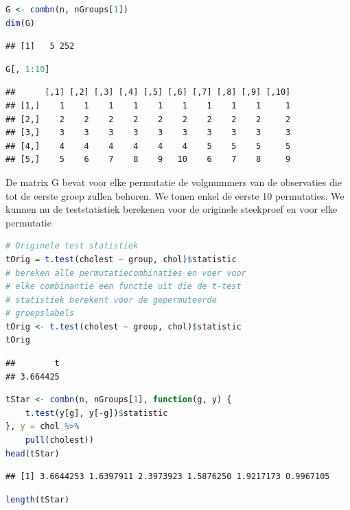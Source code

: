 \documentclass[
  12pt,dutch,coursenotes]{book}
\theoremstyle{definition}
\theoremstyle{definition}
\theoremstyle{definition}
\theoremstyle{definition}
\theoremstyle{remark}
\begin{document}
\begin{lstlisting}[language=R]
G <- combn(n, nGroups[1])
dim(G)
\end{lstlisting}

\begin{lstlisting}
## [1]   5 252
\end{lstlisting}

\begin{lstlisting}[language=R]
G[, 1:10]
\end{lstlisting}

\begin{lstlisting}
##      [,1] [,2] [,3] [,4] [,5] [,6] [,7] [,8] [,9] [,10]
## [1,]    1    1    1    1    1    1    1    1    1     1
## [2,]    2    2    2    2    2    2    2    2    2     2
## [3,]    3    3    3    3    3    3    3    3    3     3
## [4,]    4    4    4    4    4    4    5    5    5     5
## [5,]    5    6    7    8    9   10    6    7    8     9
\end{lstlisting}

De matrix G bevat voor elke permutatie de volgnummers van de observaties die tot de eerste groep zullen behoren.
We tonen enkel de eerste 10 permutaties.
We kunnen nu de teststatistiek berekenen voor de originele steekproef en voor elke permutatie

\begin{lstlisting}[language=R]
# Originele test statistiek
tOrig = t.test(cholest ~ group, chol)$statistic
# bereken alle permutatiecombinaties en voer voor
# elke combinantie een functie uit die de t-test
# statistiek berekent voor de gepermuteerde
# groepslabels
tOrig <- t.test(cholest ~ group, chol)$statistic
tOrig
\end{lstlisting}

\begin{lstlisting}
##        t 
## 3.664425
\end{lstlisting}

\begin{lstlisting}[language=R]
tStar <- combn(n, nGroups[1], function(g, y) {
    t.test(y[g], y[-g])$statistic
}, y = chol %>%
    pull(cholest))
head(tStar)
\end{lstlisting}

\begin{lstlisting}
## [1] 3.6644253 1.6397911 2.3973923 1.5876250 1.9217173 0.9967105
\end{lstlisting}

\begin{lstlisting}[language=R]
length(tStar)
\end{lstlisting}
\end{document}
